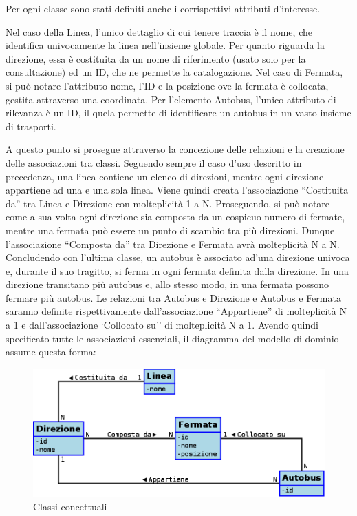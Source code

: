\newpage
Per ogni classe sono stati definiti anche i corrispettivi attributi d'interesse.

Nel caso della Linea, l'unico dettaglio di cui tenere traccia è il nome, che identifica univocamente la linea nell'insieme globale. Per quanto riguarda la direzione, essa è costituita da un nome di riferimento (usato solo per la consultazione) ed un ID, che ne permette la catalogazione.
Nel caso di Fermata, si può notare l'attributo nome, l'ID e la posizione ove la fermata è collocata, gestita attraverso una coordinata.
Per l'elemento Autobus, l'unico attributo di rilevanza è un ID, il quela permette di identificare un autobus in un vasto insieme di trasporti.

A questo punto si prosegue attraverso la concezione delle relazioni e la creazione delle associazioni tra classi.
Seguendo sempre il caso d'uso descritto in precedenza, una linea contiene un elenco di direzioni, mentre ogni direzione appartiene ad una e una sola linea. Viene quindi creata l'associazione ``Costituita da'' tra Linea e Direzione con molteplicità 1 a N.
Proseguendo, si può notare come a sua volta ogni direzione sia composta da un cospicuo numero di fermate, mentre una fermata può essere un punto di scambio tra più direzioni. Dunque l'associazione ``Composta da'' tra Direzione e Fermata avrà molteplicità N a N.
Concludendo con l'ultima classe, un autobus è associato ad'una direzione univoca e, durante il suo tragitto, si ferma in ogni fermata definita dalla direzione. In una direzione transitano più autobus e, allo stesso modo, in una fermata possono fermare più autobus. Le relazioni tra Autobus e Direzione e Autobus e Fermata saranno definite rispettivamente dall'associazione ``Appartiene'' di molteplicità N a 1 e dall'associazione `Collocato su'' di molteplicità N a 1.
\newpage
Avendo quindi specificato tutte le associazioni essenziali, il diagramma del modello di dominio assume questa forma:
\vspace{1cm}
\begin{figure}[htbp]
\begin{center}
\includegraphics[width=12cm]{contents/images/modelloDominio}
\end{center}
\caption{Classi concettuali}
\label{fig:domain_model}
\end{figure}
